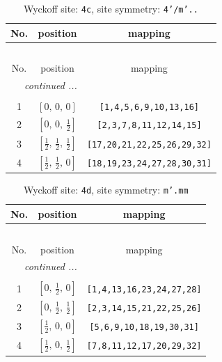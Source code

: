 \documentclass[fleqn,8pt]{jsarticle}
\begin{document}
\renewcommand{\arraystretch}{1.2}
\begin{longtable}{ccc}
\caption{Wyckoff site: {\tt 4c}, site symmetry: {\tt 4'/m'..}}
 \\
 \hline \hline
No. & position & mapping \\ \hline \endfirsthead

\multicolumn{2}{l}{\tablename\ \thetable{}} \\
 \hline \hline
No. & position & mapping \\ \hline \endhead

 \hline \hline
\multicolumn{2}{r}{\footnotesize\it continued ...} \\ \endfoot

 \hline \hline
\multicolumn{2}{r}{} \\ \endlastfoot

1 & $\left[ 0,\, 0,\, 0 \right]$ & {\tt [1,4,5,6,9,10,13,16]} \\ \hline
2 & $\left[ 0,\, 0,\, \frac{1}{2} \right]$ & {\tt [2,3,7,8,11,12,14,15]} \\ \hline
3 & $\left[ \frac{1}{2},\, \frac{1}{2},\, \frac{1}{2} \right]$ & {\tt [17,20,21,22,25,26,29,32]} \\ \hline
4 & $\left[ \frac{1}{2},\, \frac{1}{2},\, 0 \right]$ & {\tt [18,19,23,24,27,28,30,31]} \\
\end{longtable}
\renewcommand{\arraystretch}{1.2}
\begin{longtable}{ccc}
\caption{Wyckoff site: {\tt 4d}, site symmetry: {\tt m'.mm}}
 \\
 \hline \hline
No. & position & mapping \\ \hline \endfirsthead

\multicolumn{2}{l}{\tablename\ \thetable{}} \\
 \hline \hline
No. & position & mapping \\ \hline \endhead

 \hline \hline
\multicolumn{2}{r}{\footnotesize\it continued ...} \\ \endfoot

 \hline \hline
\multicolumn{2}{r}{} \\ \endlastfoot

1 & $\left[ 0,\, \frac{1}{2},\, 0 \right]$ & {\tt [1,4,13,16,23,24,27,28]} \\ \hline
2 & $\left[ 0,\, \frac{1}{2},\, \frac{1}{2} \right]$ & {\tt [2,3,14,15,21,22,25,26]} \\ \hline
3 & $\left[ \frac{1}{2},\, 0,\, 0 \right]$ & {\tt [5,6,9,10,18,19,30,31]} \\ \hline
4 & $\left[ \frac{1}{2},\, 0,\, \frac{1}{2} \right]$ & {\tt [7,8,11,12,17,20,29,32]} \\
\end{longtable}
\end{document}
